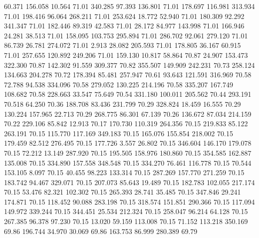   60.371  156.058   10.564        71.01
 340.285   97.393  136.801        71.01
 178.697  116.981  313.934        71.01
 198.416   96.064  268.211        71.01
 253.624   18.772   52.940        71.01
 180.309   92.292  341.347        71.01
 182.446   89.319   42.583        71.01
  28.172   84.977  143.998        71.01
 166.946   24.281   38.513        71.01
 158.095  103.753  295.894        71.01
 286.702   92.061  279.120        71.01
  86.739   26.781  274.072        71.01
   2.913   28.082  205.593        71.01
 178.805   36.167   60.915        71.01
 257.655  120.892  249.206        71.01
 159.130   10.817   58.864        70.87
  24.907  153.473  322.300        70.87
 142.302   91.559  309.377        70.82
 355.507  149.909  242.231        70.73
 258.124  134.663  204.278        70.72
 178.394   85.481  257.947        70.61
  93.643  121.591  316.969        70.58
  72.788   94.538  334.096        70.58
 279.052  130.225  214.196        70.58
 335.207  167.749  108.682        70.58
 228.663   33.547   75.649        70.54
 331.180  100.011  205.562        70.44
 293.191   70.518   64.250        70.36
 188.708   83.436  231.799        70.29
 328.824   18.459   16.555        70.29
 130.224  157.965   22.713        70.29
 268.775   86.301   67.139        70.26
 136.672   87.034  214.159        70.22
 229.106   85.842   12.913        70.17
 170.730  110.319  264.356        70.15
 219.833   85.122  263.191        70.15
 115.770  117.169  349.183        70.15
 165.076  155.854  218.002        70.15
 179.459   82.512  276.495        70.15
 177.726    3.557   26.802        70.15
 346.604  146.170  179.078        70.15
  72.212   13.149  287.920        70.15
 195.505  158.976  180.860        70.15
 354.585  162.887  135.008        70.15
 334.890  157.558  348.548        70.15
 334.270   76.461  116.778        70.15
  70.544  153.105    8.097        70.15
  40.455   98.223  133.314        70.15
 287.269  157.770  271.259        70.15
 183.742   94.467  329.071        70.15
 207.073   85.643   19.489        70.15
 182.783  102.055  217.174        70.15
  53.476   82.321  102.302        70.15
 265.393   28.741   35.485        70.15
 347.846   29.241  174.871        70.15
 118.452   90.088  283.198        70.15
 318.574  151.851  290.366        70.15
 117.094  149.972  339.244        70.15
 344.451   25.534  212.324        70.15
 258.047   96.214   64.128        70.15
 267.385   96.378   97.230        70.15
  13.020   59.159  113.008        70.15
  71.152  113.218  350.169        69.86
 196.744   34.970   30.069        69.86
 163.753   86.999  280.389        69.79
